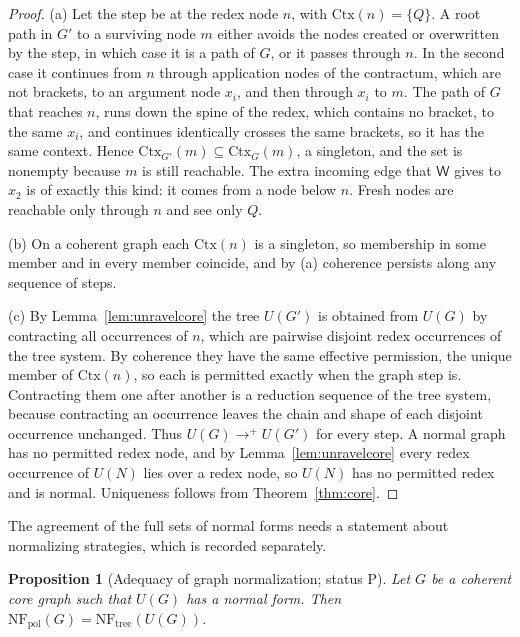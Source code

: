 \documentclass[11pt]{article}
\newtheorem{proposition}[theorem]{Proposition}
\theoremstyle{definition}
\theoremstyle{remark}
\newcommand{\cW}{\mathsf{W}}
\newcommand{\Ctx}{\mathrm{Ctx}}
\newcommand{\NF}{\mathrm{NF}}
\newcommand{\Pt}{status P}
\begin{document}
\begin{proof}
(a) Let the step be at the redex node $n$, with $\Ctx(n)=\{Q\}$. A root path in $G'$ to a surviving node $m$ either avoids the nodes created or overwritten by the step, in which case it is a path of $G$, or it passes through $n$. In the second case it continues from $n$ through application nodes of the contractum, which are not brackets, to an argument node $x_i$, and then through $x_i$ to $m$. The path of $G$ that reaches $n$, runs down the spine of the redex, which contains no bracket, to the same $x_i$, and continues identically crosses the same brackets, so it has the same context. Hence $\Ctx_{G'}(m)\subseteq\Ctx_G(m)$, a singleton, and the set is nonempty because $m$ is still reachable. The extra incoming edge that $\cW$ gives to $x_2$ is of exactly this kind: it comes from a node below $n$. Fresh nodes are reachable only through $n$ and see only $Q$.

(b) On a coherent graph each $\Ctx(n)$ is a singleton, so membership in some member and in every member coincide, and by (a) coherence persists along any sequence of steps.

(c) By Lemma~\ref{lem:unravelcore} the tree $U(G')$ is obtained from $U(G)$ by contracting all occurrences of $n$, which are pairwise disjoint redex occurrences of the tree system. By coherence they have the same effective permission, the unique member of $\Ctx(n)$, so each is permitted exactly when the graph step is. Contracting them one after another is a reduction sequence of the tree system, because contracting an occurrence leaves the chain and shape of each disjoint occurrence unchanged. Thus $U(G)\to^{+}U(G')$ for every step. A normal graph has no permitted redex node, and by Lemma~\ref{lem:unravelcore} every redex occurrence of $U(N)$ lies over a redex node, so $U(N)$ has no permitted redex and is normal. Uniqueness follows from Theorem~\ref{thm:core}.
\end{proof}

The agreement of the full sets of normal forms needs a statement about normalizing strategies, which is recorded separately.

\begin{proposition}[Adequacy of graph normalization; \Pt]\label{prop:adequacyd}
Let $G$ be a coherent core graph such that $U(G)$ has a normal form. Then $\NF_{\mathrm{pol}}(G)=\NF_{\mathrm{tree}}(U(G))$.
\end{proposition}
\end{document}
